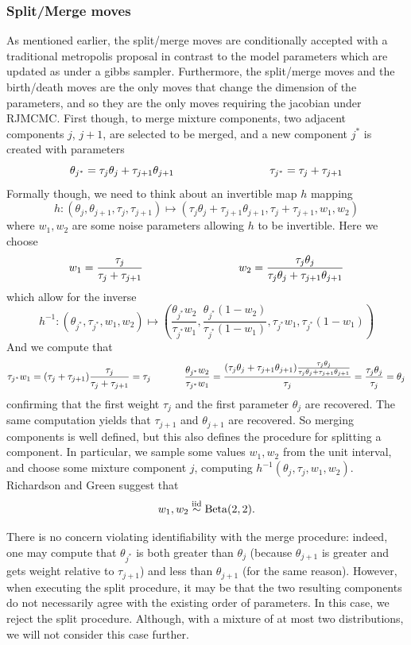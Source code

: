 \documentclass[12pt, reqno]{amsart}
\begin{document}
\subsubsection{Split/Merge moves}
As mentioned earlier, the split/merge moves are conditionally accepted with a traditional metropolis proposal in contrast to the model parameters which are updated as under a gibbs sampler. Furthermore, the split/merge moves and the birth/death moves are the only moves that change the dimension of the parameters, and so they are the only moves requiring the jacobian under RJMCMC. First though, to merge mixture components, two adjacent components $j$, $j+1$, are selected to be merged, and a new component $j^*$ is created with parameters
\[
\theta_{j^*} = \tau_j\theta_j + \tau_{j+1}\theta_{j+1} \hspace{0.25\linewidth} \tau_{j^*} = \tau_j + \tau_{j+1}
\]
Formally though, we need to think about an invertible map $h$ mapping
\[h: (\theta_j, \theta_{j+1}, \tau_j, \tau_{j+1}) \mapsto (\tau_j\theta_j + \tau_{j+1}\theta_{j+1}, \tau_j + \tau_{j+1}, w_1, w_2) \]
where $w_1, w_2$ are some noise parameters allowing $h$ to be invertible. Here we choose
\[ w_1 = \frac{\tau_j}{\tau_j + \tau_{j+1}} \hspace{0.25\linewidth} w_2 = \frac{\tau_j\theta_j}{\tau_j\theta_j + \tau_{j+1}\theta_{j+1}}
\]
which allow for the inverse
\[h^{-1}: (\theta_{j^*}, \tau_{j^*}, w_1, w_2) \mapsto \left(\frac{\theta_{j^*}w_2}{\tau_{j^*}w_1}, \frac{\theta_{j^*}(1-w_2)}{\tau_{j^*}(1-w_1)}, \tau_{j^*}w_1, \tau_{j^*}(1-w_1) \right)\]
And we compute that
\[\tau_{j^*}w_1 = (\tau_{j} + \tau_{j+1})\frac{\tau_{j}}{\tau_j + \tau_{j+1}} = \tau_j \hspace{0.1\linewidth} \frac{\theta_{j^*}w_2}{\tau_{j^*}w_1} = \frac{(\tau_j\theta_{j} + \tau_{j+1}\theta_{j+1})\frac{\tau_j\theta_j}{\tau_j\theta_j + \tau_{j+1}\theta_{j+1}}}{\tau_j} = \frac{\tau_j\theta_j}{\tau_j} = \theta_j \]
confirming that the first weight $\tau_j$ and the first parameter $\theta_j$ are recovered. The same computation yields that $\tau_{j+1}$ and $\theta_{j+1}$ are recovered. So merging components is well defined, but this also defines the procedure for splitting a component. In particular, we sample some values $w_1, w_2$ from the unit interval, and choose some mixture component $j$, computing $h^{-1}(\theta_j, \tau_j, w_1, w_2)$. Richardson and Green suggest that
\[w_1, w_2 \overset{\mathrm{iid}}\sim \mathrm{Beta}(2,2). \]

There is no concern violating identifiability with the merge procedure: indeed, one may compute that $\theta_{j^*}$ is both greater than $\theta_j$ (because $\theta_{j+1}$ is greater and gets weight relative to $\tau_{j+1}$) and less than $\theta_{j+1}$ (for the same reason). However, when executing the split procedure, it may be that the two resulting components do not necessarily agree with the existing order of parameters. In this case, we reject the split procedure. Although, with a mixture of at most two distributions, we will not consider this case further.
\end{document}
